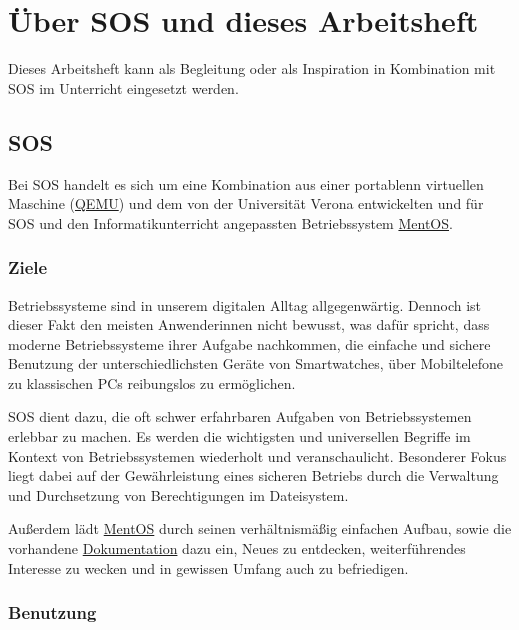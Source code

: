 \documentclass[12pt]{article}
\begin{document}
\newpage
{}

\section*{Über \gls{SOS} und dieses Arbeitsheft}

Dieses Arbeitsheft kann als Begleitung oder als Inspiration in Kombination mit \gls{SOS} im Unterricht eingesetzt werden.

\subsection*{\acrfull{SOS}}

Bei \gls{SOS} handelt es sich um eine Kombination aus einer portablenn virtuellen Maschine (\href{https://www.qemu.org/}{QEMU}) und dem von der Universität Verona entwickelten und für \gls{SOS} und den Informatikunterricht angepassten Betriebssystem \href{https://mentos-team.github.io/}{MentOS}.

\subsubsection*{Ziele}

Betriebssysteme sind in unserem digitalen Alltag allgegenwärtig.
Dennoch ist dieser Fakt den meisten Anwenderinnen nicht bewusst, was dafür spricht, dass moderne Betriebssysteme ihrer Aufgabe nachkommen, die einfache und sichere Benutzung der unterschiedlichsten Geräte von Smartwatches, über Mobiltelefone zu klassischen PCs reibungslos zu ermöglichen.

\gls{SOS} dient dazu, die oft schwer erfahrbaren Aufgaben von Betriebssystemen erlebbar zu machen.
Es werden die wichtigsten und universellen Begriffe im Kontext von Betriebssystemen wiederholt und veranschaulicht.
Besonderer Fokus liegt dabei auf der Gewährleistung eines sicheren Betriebs durch die Verwaltung und Durchsetzung von Berechtigungen im Dateisystem.

Außerdem lädt \href{https://github.com/mentos-team/MentOS}{MentOS} durch seinen verhältnismäßig einfachen Aufbau, sowie die vorhandene \href{https://mentos-team.github.io/doc/doxygen/index.html}{Dokumentation} dazu ein, Neues zu entdecken, weiterführendes Interesse zu wecken und in gewissen Umfang auch zu befriedigen.

\subsubsection*{Benutzung}
\end{document}
